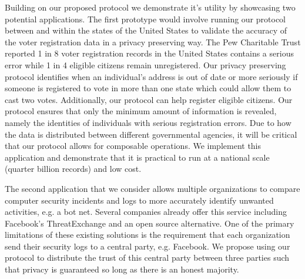Building on our proposed protocol we demonstrate it's utility by showcasing two potential applications. The first prototype would involve running our protocol between and within the states of the United States to validate the accuracy of the voter registration data in a privacy preserving way. The Pew Charitable Trust\cite{pew} reported 1 in 8 voter registration records in the United States contains a serious error while 1 in 4 eligible citizens remain unregistered. Our privacy preserving protocol identifies when an individual's address is out of date or more seriously if someone is registered to vote in more than one state which could allow them to cast two votes. 
\iffullversion
Additionally, our protocol can help register eligible citizens. Our protocol ensures that only the minimum amount of information is revealed, namely the identities of individuals with serious registration errors.
\fi 
Due to how the data is distributed between different governmental agencies, it will be critical that our protocol allows for composable operations. We implement this application and demonstrate that it is practical to run at a national scale (quarter billion records) and low cost.

The second application that we consider allows multiple organizations to compare computer security incidents and logs to more accurately identify unwanted activities, e.g. a bot net. Several companies already offer this service including Facebook's ThreatExchange\cite{threat} and an open source alternative\cite{alt_threat}. One of the primary limitations of these existing solutions is the requirement that each organization send their security logs to a central party, e.g. Facebook. We propose using our protocol to distribute the trust of this central party between three parties such that privacy is guaranteed so long as there is an honest majority.



